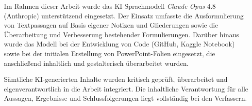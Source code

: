 \documentclass[
  a4paper, 12pt,
  parskip=half,
  headings=small,
  bibliography=totoc
]{scrartcl}
\begin{document}
Im Rahmen dieser Arbeit wurde das KI-Sprachmodell \textit{Claude Opus} 4.8 (Anthropic) unterstützend eingesetzt. 
Der Einsatz umfasste die Ausformulierung von Textpassagen auf Basis eigener Notizen und Gliederungen sowie die Überarbeitung 
und Verbesserung bestehender Formulierungen. 
Darüber hinaus wurde das Modell bei der Entwicklung von Code (GitHub, Kaggle Notebook) sowie bei der initialen 
Erstellung von PowerPoint-Folien eingesetzt, die anschließend inhaltlich und gestalterisch überarbeitet wurden.

Sämtliche KI-generierten Inhalte wurden kritisch geprüft, überarbeitet und eigenverantwortlich in die Arbeit integriert. 
Die inhaltliche Verantwortung für alle Aussagen, Ergebnisse und Schlussfolgerungen liegt vollständig bei den Verfassern.

\printbibliography
\end{document}
